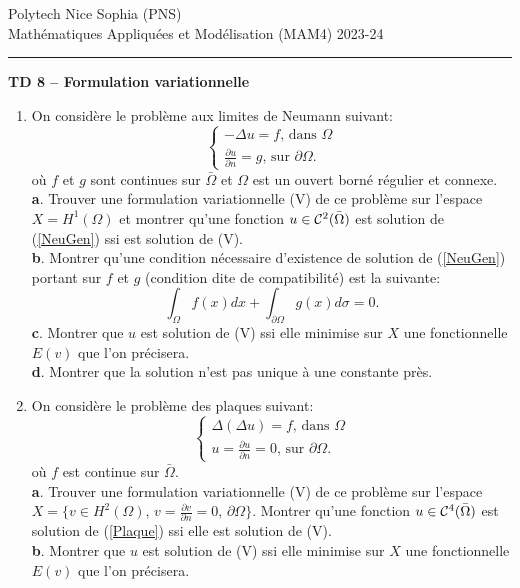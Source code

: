 \documentclass[12pt,a4paper]{article}
\begin{document}
 \hfill Polytech Nice Sophia (PNS)\\
\noindent Math\'ematiques Appliqu\'ees et Mod\'elisation (MAM4) \hfill 2023-24 \\

\hrule

\bigskip
\bigskip

\begin{center} {\bf TD 8 -- Formulation variationnelle} \end{center}

\bigskip
\begin{enumerate}
\item On consid\`ere le probl\`eme aux limites de Neumann suivant:
\begin{equation}\label{NeuGen}
\begin{cases}
-\Delta u = f,\,\text{dans }\Omega\\
\frac{\partial u}{\partial n} = g,\,\text{sur }\partial\Omega.
\end{cases}
\end{equation}
o\`u $f$ et $g$ sont continues sur $\bar\Omega$ et $\Omega$ est un ouvert born\'e r\'egulier et connexe.\\
{\bf a}. Trouver une formulation variationnelle (V) de ce probl\`eme sur l'espace $X=H^1(\Omega)$ et montrer qu'une fonction $u\in{\cal C}^2(\bar\Omega)$ est solution de (\ref{NeuGen}) ssi est solution de (V).\\
{\bf b}. Montrer qu'une condition n\'ecessaire d'existence de solution
de (\ref{NeuGen}) portant sur $f$ et $g$ (condition dite de
compatibilit\'e) est la suivante:
$$
\int_{\Omega}f(x)dx+ \int_{\partial\Omega} g(x)d\sigma= 0.
$$
{\bf c}. Montrer que $u$ est solution de (V) ssi elle minimise sur $X$ une fonctionnelle $E(v)$ que l'on pr\'ecisera.\\
{\bf d}. Montrer que la solution n'est pas unique à une constante pr\`es. 

\item On consid\`ere le probl\`eme des plaques suivant:
\begin{equation}\label{Plaque}
\begin{cases}
\Delta(\Delta u) = f,\,\text{dans }\Omega\\
u = \frac{\partial u}{\partial n} = 0,\,\text{sur }\partial\Omega.
\end{cases}
\end{equation}
o\`u $f$ est continue sur $\bar\Omega$.\\
{\bf a}. Trouver une formulation variationnelle (V) de ce probl\`eme sur l'espace $X=\{v\in H^2(\Omega),\, v=\frac{\partial v}{\partial n}=0,\, \partial\Omega\}$. Montrer qu'une fonction $u\in{\cal C}^4(\bar\Omega)$ est solution de (\ref{Plaque}) ssi elle est solution de (V).\\
{\bf b}. Montrer que $u$ est solution de (V) ssi elle minimise sur $X$ une fonctionnelle $E(v)$ que l'on pr\'ecisera.\\


\end{enumerate}
\end{document}
